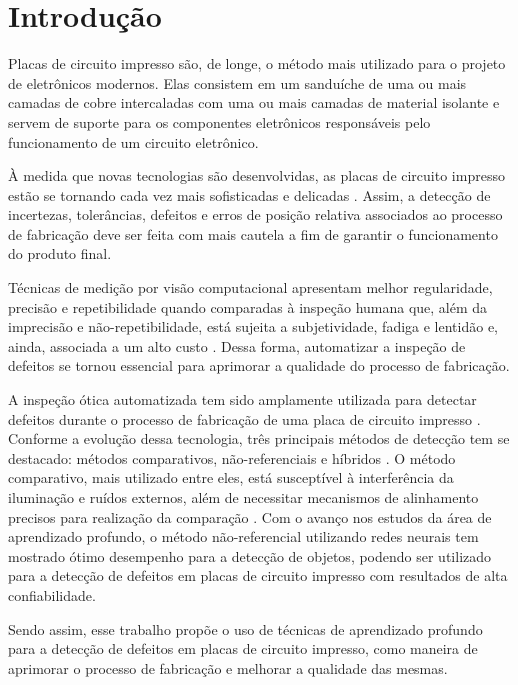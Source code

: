 \chapter{Introdução}
Placas de circuito impresso são, de longe, o método mais utilizado para o projeto de eletrônicos modernos. Elas consistem em um sanduíche de uma ou mais camadas de cobre intercaladas com uma ou mais camadas de material isolante \cite{ref:Zumbahlen} e servem de suporte para os componentes eletrônicos responsáveis pelo funcionamento de um circuito eletrônico.

À medida que novas tecnologias são desenvolvidas, as placas de circuito impresso estão se tornando cada vez mais sofisticadas e delicadas \cite{ref:Hu-Wang}. Assim, a detecção de incertezas, tolerâncias, defeitos e erros de posição relativa associados ao processo de fabricação \cite{ref:Leta-Feliciano-Martins} deve ser feita com mais cautela a fim de garantir o funcionamento do produto final.

Técnicas de medição por visão computacional apresentam melhor regularidade, precisão e repetibilidade quando comparadas à inspeção humana que, além da imprecisão e não-repetibilidade, está sujeita a subjetividade, fadiga e lentidão e, ainda, associada a um alto custo \cite{ref:Leta-Feliciano-Martins}. Dessa forma, automatizar a inspeção de defeitos se tornou essencial para aprimorar a qualidade do processo de fabricação.

A inspeção ótica automatizada tem sido amplamente utilizada para detectar defeitos durante o processo de fabricação de uma placa de circuito impresso \cite{ref:Chin-Harlow}. Conforme a evolução dessa tecnologia, três principais métodos de detecção tem se destacado: métodos comparativos, não-referenciais e híbridos \cite{ref:Wu-Wang-Liu}. O método comparativo, mais utilizado entre eles, está susceptível à interferência da iluminação e ruídos externos, além de necessitar mecanismos de alinhamento precisos para realização da comparação \cite{ref:Hu-Wang}. Com o avanço nos estudos da área de aprendizado profundo, o método não-referencial utilizando redes neurais tem mostrado ótimo desempenho para a detecção de objetos, podendo ser utilizado para a detecção de defeitos em placas de circuito impresso com resultados de alta confiabilidade.

Sendo assim, esse trabalho propõe o uso de técnicas de aprendizado profundo para a detecção de defeitos em placas de circuito impresso, como maneira de aprimorar o processo de fabricação e melhorar a qualidade das mesmas.

